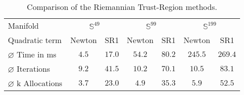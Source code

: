 \begin{table}[H]
    \label{tab:Results}
    \resizebox{\textwidth}{!}
    {
        \begin{tabular}{lcccccc}
            \toprule
            Manifold & \multicolumn{2}{c}{$\mathbb{S}^{49}$}& \multicolumn{2}{c}{$\mathbb{S}^{99}$} & \multicolumn{2}{c}{$\mathbb{S}^{199}$}\\ 
            \cmidrule(lr){2-3} \cmidrule(lr){4-5} \cmidrule(lr){6-7}
            Quadratic term & Newton & SR1 & Newton & SR1 & Newton & SR1 \\ 

            $\varnothing$ Time in ms & $4.5$ & $17.0$ & $54.2$ & $80.2$ & $245.5$ & $269.4$\\ 
            $\varnothing$ Iterations & $9.2$ & $41.5$ & $10.2$ & $70.1$ & $10.5$ & $83.1$ \\
            $\varnothing$ k Allocations& $3.7$ & $23.0$ & $4.9$ & $35.3$ & $5.9$ & $52.5$ \\
            \bottomrule
        \end{tabular}
    }
    \caption{Comparison of the Riemannian Trust-Region methods.}
\end{table}

